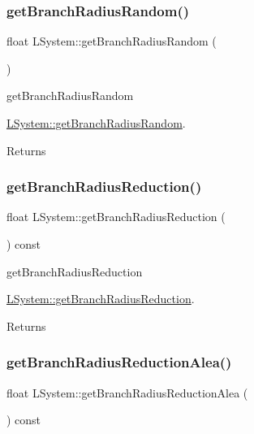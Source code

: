 \subsubsection{\texorpdfstring{get\+Branch\+Radius\+Random()}{getBranchRadiusRandom()}}
{\footnotesize\ttfamily float L\+System\+::get\+Branch\+Radius\+Random (\begin{DoxyParamCaption}{ }\end{DoxyParamCaption})}



get\+Branch\+Radius\+Random 

\hyperlink{classLSystem_aceef49d8f1e28428711c43f7d0487fed}{L\+System\+::get\+Branch\+Radius\+Random}.

\begin{DoxyReturn}{Returns}

\end{DoxyReturn}
\mbox{\label{classLSystem_a71a1f31a07f2dc97cfa5081c716b394c}} 
\subsubsection{\texorpdfstring{get\+Branch\+Radius\+Reduction()}{getBranchRadiusReduction()}}
{\footnotesize\ttfamily float L\+System\+::get\+Branch\+Radius\+Reduction (\begin{DoxyParamCaption}{ }\end{DoxyParamCaption}) const}



get\+Branch\+Radius\+Reduction 

\hyperlink{classLSystem_a71a1f31a07f2dc97cfa5081c716b394c}{L\+System\+::get\+Branch\+Radius\+Reduction}.

\begin{DoxyReturn}{Returns}

\end{DoxyReturn}
\mbox{\label{classLSystem_af237321da5b4bad46d2422cd29b46986}} 
\subsubsection{\texorpdfstring{get\+Branch\+Radius\+Reduction\+Alea()}{getBranchRadiusReductionAlea()}}
{\footnotesize\ttfamily float L\+System\+::get\+Branch\+Radius\+Reduction\+Alea (\begin{DoxyParamCaption}{ }\end{DoxyParamCaption}) const}




